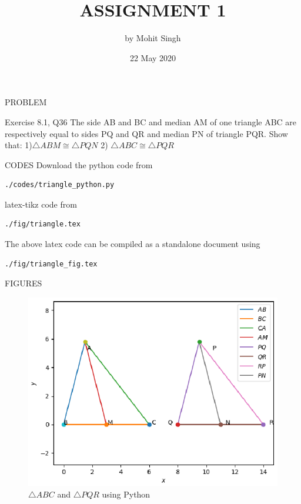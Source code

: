 \documentclass[11pt]{beamer}
\title{ASSIGNMENT 1}
\author{by Mohit Singh}
\institute{IIEST, Shibpur}
\date{22 May 2020}
\begin{document}
\maketitle
\begin{frame}{PROBLEM}
\begin{block}{Exercise 8.1, Q36}
The side AB and BC and median AM of one triangle ABC are respectively equal to sides PQ and QR and median PN of triangle PQR. Show that:
\newline
\newline
{1)$\triangle  ABM  \cong   \triangle  PQN $}
\newline
{2) $\triangle  ABC  \cong   \triangle  PQR $}
\end{block}

\end{frame}

\begin{frame}[containsverbatim]{CODES}
Download the python code from
\begin{lstlisting}
./codes/triangle_python.py
\end{lstlisting}
latex-tikz code from
\begin{lstlisting}
./fig/triangle.tex
\end{lstlisting}
The above latex code can be compiled as a standalone document using
\begin{lstlisting}
./fig/triangle_fig.tex
\end{lstlisting} 
\end{frame}

\begin{frame}{FIGURES}
\begin{figure}
\includegraphics[scale=0.5]{Figure_1.eps}
\caption{$\triangle ABC$ and $\triangle PQR$ using Python}
\end{figure}
\end{frame}
\end{document}
